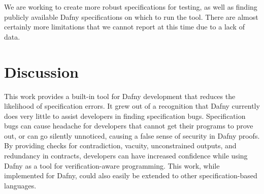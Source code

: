 \documentclass[sigplan,screen,anonymous]{acmart}
\begin{document}
We are working to create more robust specifications for testing, as well as finding publicly available Dafny specifications on which to run the tool. There are almost certainly more limitations that we cannot report at this time due to a lack of data.

\section{Discussion}

This work provides a built-in tool for Dafny development that reduces the likelihood of specification errors. It grew out of a recognition that Dafny currently does very little to
assist developers in finding specification bugs. Specification bugs can cause headache for
developers that cannot get their programs to prove out, or can go silently unnoticed, causing a
false sense of security in Dafny proofs. By providing checks for contradiction, vacuity, unconstrained outputs, and redundancy in contracts, developers can have increased confidence
while using Dafny as a tool for verification-aware programming. This work, while implemented for
Dafny, could also easily be extended to other specification-based languages.




\end{document}
